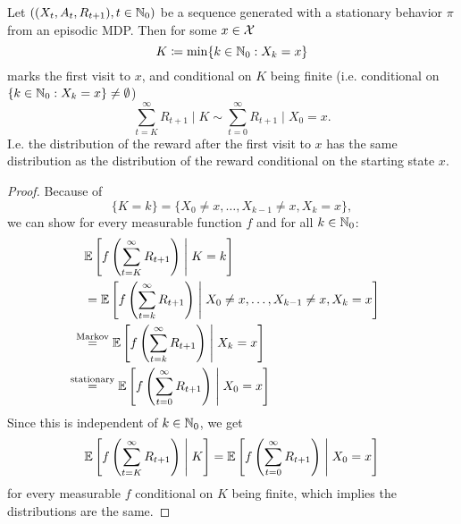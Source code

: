 \begin{lemma}\label{appx8}
    Let \(((X_t,A_t,R_{t+1}),t\in\mathbb{N}_0)\) be a sequence generated with a stationary behavior \(\pi\) from an episodic MDP. Then for some \(x\in\mathcal{X}\)
    \[
        K\coloneqq\min\{k\in\mathbb{N}_0:X_k=x\}
    \]
    marks the first visit to \(x\), and conditional on \(K\) being finite (i.e. conditional on \(\{k\in\mathbb{N}_0:X_k=x\}\neq \emptyset\))
    \[
        \sum_{t=K}^\infty R_{t+1}\;\Big|\; K \sim \sum_{t=0}^\infty R_{t+1} \;\Big|\; X_0=x.
    \]
    I.e. the distribution of the reward after the first visit to \(x\) has the same distribution as the distribution of the reward conditional on the starting state \(x\). 
\end{lemma}
\begin{proof}
    Because of
    \[
        \{K=k\}=\{ X_0\neq x, \dots, X_{k-1}\neq x, X_k=x\},
    \]
    we can show for every measurable function \(f\) and for all \(k\in\mathbb{N}_0\):
    \begin{align*}
        &\E\left[f\left(\sum_{t=K}^\infty R_{t+1}\right)\;\middle|\; K=k\right]\\
        &=\E\left[f\left(\sum_{t=k}^\infty R_{t+1}\right)\;\middle|\; X_0\neq x, \dots, X_{k-1}\neq x, X_k=x\right]\\
        &\lxeq{\text{Markov}} \E\left[f\left(\sum_{t=k}^\infty R_{t+1}\right)\;\middle|\; X_k=x\right]\\
        &\lxeq{\text{stationary}} \E\left[f\left(\sum_{t=0}^\infty R_{t+1}\right)\;\middle|\; X_0=x\right]
    \end{align*}
    Since this is independent of \(k\in \mathbb{N}_0\), we get
    \begin{align*}
        \mathbb{E}\left[f\left(\sum_{t=K}^\infty R_{t+1}\right)\;\middle|\; K\right]
        =\mathbb{E}\left[f\left(\sum_{t=0}^\infty R_{t+1}\right)\;\middle|\; X_0=x\right]
    \end{align*}
    for every measurable \(f\) conditional on \(K\) being finite, which implies the distributions are the same.
\end{proof}

